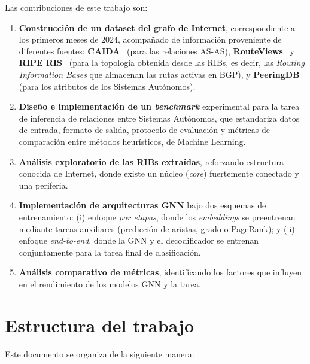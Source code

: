 Las contribuciones de este trabajo son:
\begin{enumerate}

    \item \textbf{Construcción de un dataset del grafo de Internet}, correspondiente a los primeros meses de 2024, acompañado de información proveniente de diferentes fuentes: \textbf{CAIDA}~\cite{CAIDAS-relationship} (para las relaciones AS-AS), \textbf{RouteViews}~\cite{RouteViewsProject} y \textbf{RIPE RIS}~\cite{RIPE-RIS} (para la topología obtenida desde las RIBs, es decir, las \textit{Routing Information Bases} que almacenan las rutas activas en BGP), y \textbf{PeeringDB}~\cite{PeeringDB} (para los atributos de los Sistemas Autónomos).

    \item \textbf{Diseño e implementación de un \textit{benchmark}} experimental para la tarea de inferencia de relaciones entre Sistemas Autónomos, que estandariza datos de entrada, formato de salida, protocolo de evaluación y métricas de comparación entre métodos heurísticos, de Machine Learning.
    \item \textbf{Análisis exploratorio de las RIBs extraídas}, reforzando estructura conocida de Internet, donde existe un núcleo (\textit{core}) fuertemente conectado y una periferia.

    \item \textbf{Implementación de arquitecturas GNN} bajo dos esquemas de entrenamiento: (i) enfoque \textit{por etapas}, donde los \textit{embeddings} se preentrenan mediante tareas auxiliares (predicción de aristas, grado o PageRank); y (ii) enfoque \textit{end-to-end}, donde la GNN y el decodificador se entrenan conjuntamente para la tarea final de clasificación.

    \item \textbf{Análisis comparativo de métricas}, identificando los factores que influyen en el rendimiento de los modelos GNN y la tarea.
    
\end{enumerate}

\section{Estructura del trabajo}
Este documento se organiza de la siguiente manera:

